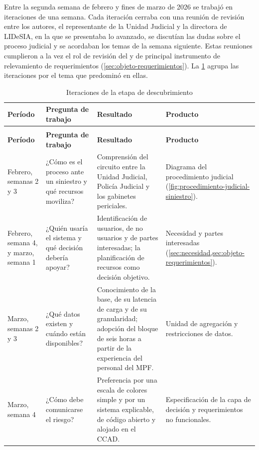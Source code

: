Entre la segunda semana de febrero y fines de marzo de 2026 se trabajó en iteraciones de una semana. Cada iteración cerraba con una reunión de revisión entre los autores, el representante de la Unidad Judicial y la directora de LIDeSIA, en la que se presentaba lo avanzado, se discutían las dudas sobre el proceso judicial y se acordaban los temas de la semana siguiente. Estas reuniones cumplieron a la vez el rol de revisión del  y de principal instrumento de relevamiento de requerimientos (\cref{sec:objeto-requerimientos}). La \cref{tab:iteraciones} agrupa las iteraciones por el tema que predominó en ellas.

{\small
\begin{longtable}{@{}>{\raggedright\arraybackslash}p{}
                    >{\raggedright\arraybackslash}p{}
                    >{\raggedright\arraybackslash}p{}
                    >{\raggedright\arraybackslash}p{}@{}}
\caption{Iteraciones de la etapa de descubrimiento}
\label{tab:iteraciones} \\
\toprule
\textbf{Período} & \textbf{Pregunta de trabajo} & \textbf{Resultado} & \textbf{Producto} \\
\midrule
\endfirsthead
\multicolumn{4}{@{}l}{\footnotesize\textit{Tabla \ref{tab:iteraciones} (continuación)}} \\
\toprule
\textbf{Período} & \textbf{Pregunta de trabajo} & \textbf{Resultado} & \textbf{Producto} \\
\midrule
\endhead
\bottomrule
\endfoot
Febrero, semanas 2 y 3 & ¿Cómo es el proceso ante un siniestro y qué recursos moviliza? & Comprensión del circuito entre la Unidad Judicial, Policía Judicial y los gabinetes periciales. & Diagrama del procedimiento judicial (\cref{fig:procedimiento-judicial-siniestro}). \\
Febrero, semana 4, y marzo, semana 1 & ¿Quién usaría el sistema y qué decisión debería apoyar? & Identificación de usuarios, de no usuarios y de partes interesadas; la planificación de recursos como decisión objetivo. & Necesidad y partes interesadas (\cref{sec:necesidad,sec:objeto-requerimientos}). \\
Marzo, semanas 2 y 3 & ¿Qué datos existen y cuándo están disponibles? & Conocimiento de la base, de su latencia de carga y de su granularidad; adopción del bloque de seis horas a partir de la experiencia del personal del MPF. & Unidad de agregación y restricciones de datos. \\
Marzo, semana 4 & ¿Cómo debe comunicarse el riesgo? & Preferencia por una escala de colores simple y por un sistema explicable, de código abierto y alojado en el CCAD. & Especificación de la capa de decisión y requerimientos no funcionales. \\
\end{longtable}
}

